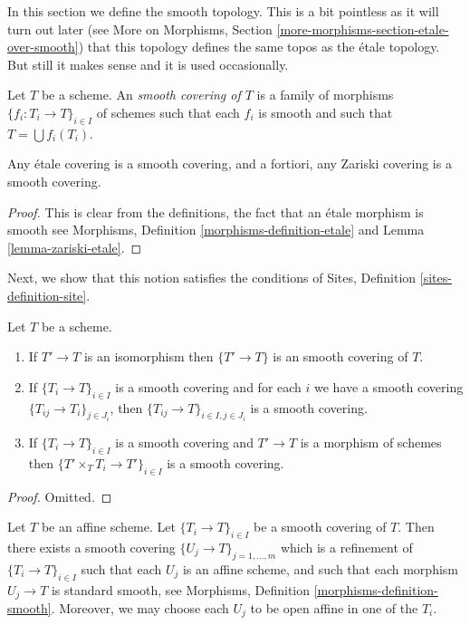 \noindent
In this section we define the smooth topology.
This is a bit pointless as it will turn out later (see
More on Morphisms, Section \ref{more-morphisms-section-etale-over-smooth})
that this topology defines the same topos as the
\'etale topology. But still it makes sense and it is used
occasionally.

\begin{definition}
\label{definition-smooth-covering}
Let $T$ be a scheme. An {\it smooth covering of $T$} is a family
of morphisms $\{f_i : T_i \to T\}_{i \in I}$ of schemes
such that each $f_i$ is smooth and such
that $T = \bigcup f_i(T_i)$.
\end{definition}

\begin{lemma}
\label{lemma-zariski-etale-smooth}
Any \'etale covering is a smooth covering, and a fortiori,
any Zariski covering is a smooth covering.
\end{lemma}

\begin{proof}
This is clear from the definitions, the fact that an \'etale morphism is
smooth see
Morphisms, Definition \ref{morphisms-definition-etale}
and Lemma \ref{lemma-zariski-etale}.
\end{proof}

\noindent
Next, we show that this notion satisfies the conditions of
Sites, Definition \ref{sites-definition-site}.

\begin{lemma}
\label{lemma-smooth}
Let $T$ be a scheme.
\begin{enumerate}
\item If $T' \to T$ is an isomorphism then $\{T' \to T\}$
is an smooth covering of $T$.
\item If $\{T_i \to T\}_{i\in I}$ is a smooth covering and for each
$i$ we have a smooth covering $\{T_{ij} \to T_i\}_{j\in J_i}$, then
$\{T_{ij} \to T\}_{i \in I, j\in J_i}$ is a smooth covering.
\item If $\{T_i \to T\}_{i\in I}$ is a smooth covering
and $T' \to T$ is a morphism of schemes then
$\{T' \times_T T_i \to T'\}_{i\in I}$ is a smooth covering.
\end{enumerate}
\end{lemma}

\begin{proof}
Omitted.
\end{proof}

\begin{lemma}
\label{lemma-smooth-affine}
Let $T$ be an affine scheme.
Let $\{T_i \to T\}_{i \in I}$ be a smooth covering of $T$.
Then there exists a smooth covering
$\{U_j \to T\}_{j = 1, \ldots, m}$ which is a refinement
of $\{T_i \to T\}_{i \in I}$ such that each $U_j$ is an affine
scheme, and such that each morphism $U_j \to T$ is standard
smooth, see Morphisms, Definition \ref{morphisms-definition-smooth}.
Moreover, we may choose each $U_j$ to be open affine in one of the $T_i$.
\end{lemma}

